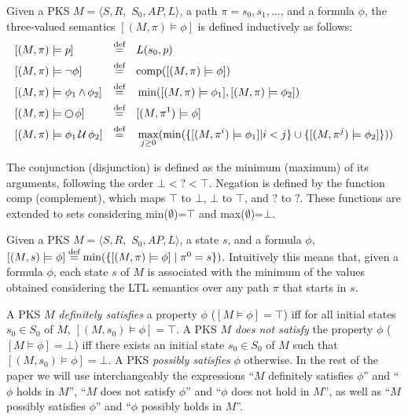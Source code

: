 \begin{definition}
Given a PKS $M = \langle S, R,$ $S_0, AP, L \rangle$, a path $\pi=s_0,s_1,\ldots$, and a formula $\phi$, the three-valued semantics $[(M,\pi)\models\phi]$ is defined inductively as follows:
\begin{align*}
&[(M,\pi) \models p] & \buildrel \text{def}\over = &&& L(s_0,p)\\
&[(M,\pi) \models \lnot\phi] & \buildrel \text{def}\over = &&& \textnormal{comp}([(M,\pi) \models\phi]) \\
&[(M,\pi) \models \phi_1 \LTLand \phi_2] & \buildrel \text{def}\over =   &&& \min([(M,\pi) \models\phi_1],[(M,\pi) \models\phi_2])\\
&[(M,\pi) \models \LTLnext \phi] & \buildrel \text{def}\over =  &&& [(M,\pi^1) \models\phi]\\
&[(M,\pi) \models \phi_1 \LTLuntil \phi_2] & \buildrel \text{def}\over =  &&& \max_{j\geq 0}(\min(\{[(M,\pi^i) \models\phi_1]|i<j\} \cup \{[(M,\pi^j) \models\phi_2]\}))
\end{align*}
\end{definition}


The conjunction (disjunction) is defined as the minimum (maximum) of its arguments, following the order $\bot<?<\top$. Negation is defined by the function comp (complement), which maps $\top$ to $\bot$, $\bot$ to $\top$, and $?$ to $?$. These functions are extended to sets considering min($\emptyset$)=$\top$ and max($\emptyset$)=$\bot$.

Given a PKS $M = \langle S, R,$ $S_0, AP, L \rangle$, a state $s$, and a formula $\phi$,  $[(M, s) \models \phi] \buildrel \text{def}\over =   \min(\{[(M, \pi) \models \phi] \mid \pi^0=s\})$.
Intuitively this means that, given a formula $\phi$, each state $s$ of $M$ is associated with the minimum of the values obtained considering the LTL semantics over any path $\pi$ that starts in $s$.





A PKS $M$ \emph{definitely satisfies} a property $\phi$ ($[M \models \phi]=\top$) iff for all initial states $s_0 \in S_0$ of $M$, $[(M, s_0) \models \phi]=\top$. 
A PKS $M$ \emph{does not satisfy} the property $\phi$ ($[M \models \phi]=\bot$) iff there exists an initial state $s_0 \in S_0$ of $M$ such that  $[(M, s_0) \models \phi]=\bot$.
A PKS \emph{possibly satisfies} $\phi$ otherwise.
In the rest of the paper we will use interchangeably the expressions ``$M$ definitely satisfies $\phi$'' and ``$\phi$ holds in $M$'', ``$M$ does not satisfy $\phi$'' and ``$\phi$ does not hold in $M$'', as well as ``$M$ possibly satisfies $\phi$'' and ``$\phi$ possibly holds in $M$''.



